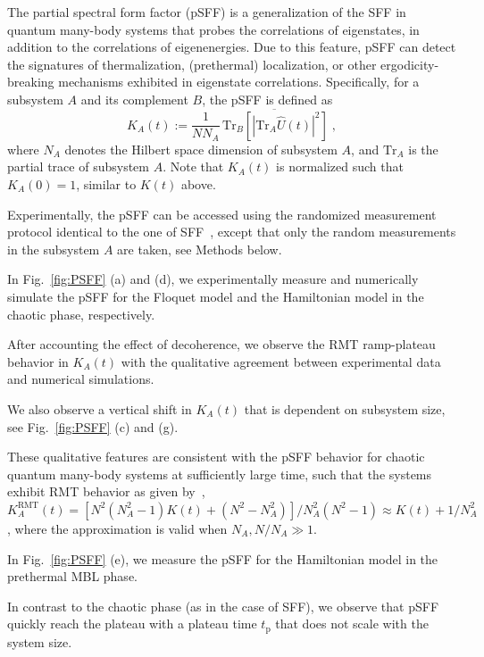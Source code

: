 \documentclass[aps,prx,reprint,twocolumn,superscriptaddress,floatfix,nofootinbib]{revtex4-2}
\newcommand{\tplateau}{t_{\mathrm{p}}}
\newcommand{\Uh}{\hat{U}}
\begin{document}
The partial spectral form factor (pSFF) is a generalization of the SFF in quantum many-body systems that probes the correlations of eigenstates, in addition to the correlations of eigenenergies. Due to this feature, pSFF can detect the signatures of thermalization, (prethermal) localization, or other ergodicity-breaking mechanisms exhibited in eigenstate correlations. Specifically, for a subsystem $A$ and its complement $B$, the pSFF is defined as \cite{ZollerSFF2021, Gong_2020, Garratt2021prx}
\begin{equation}
K_A\left(t\right):= \frac{1}{N N_A} \overline{ \,
\mathrm{Tr}_B\left[\left| \mathrm{Tr}_A\Uh(t)
\right|^2\right]
} \; ,
\end{equation}
where $N_A$
denotes the Hilbert space dimension of subsystem $A$, and $\mathrm{Tr}_A$ is the partial trace of subsystem $A$. Note that $K_A\left( t \right)$ is normalized such that $K_A(0)=1$, similar to $K(t)$ above.

Experimentally, the pSFF can be accessed using the randomized measurement protocol identical to the one of SFF~\cite{ZollerSFF2021}, except that only the random measurements in the subsystem $A$ are taken, see Methods below.

In Fig.~\ref{fig:PSFF} (a) and (d), we experimentally measure and numerically simulate the pSFF for the Floquet model and the Hamiltonian model in the chaotic phase, respectively.

After accounting the effect of decoherence, we observe the RMT ramp-plateau behavior in $K_A(t)$ with the qualitative agreement between experimental data and numerical simulations.

We also observe a vertical shift in $K_A(t)$ that is dependent on subsystem size, see Fig.~\ref{fig:PSFF}  (c) and (g).

These qualitative features are consistent with the pSFF behavior for chaotic quantum many-body systems at sufficiently large time, such that the systems exhibit RMT behavior as given by~\cite{ZollerSFF2021},
$K^{\mathrm{RMT}}_{A}(t) = [N^2(N^2_A - 1)K(t) + (N^2-N_A^2)]/N_A^2(N^2 - 1) \approx K(t) + 1/N_A^2$, where the approximation is valid when $N_A, N/N_A \gg 1$.

In Fig.~\ref{fig:PSFF} (e), we measure the pSFF for the Hamiltonian model in the prethermal MBL phase.

In contrast to the chaotic phase (as in the case of SFF), we observe that pSFF quickly reach the plateau with a plateau time $\tplateau$ that does not scale with the system size.
\end{document}
